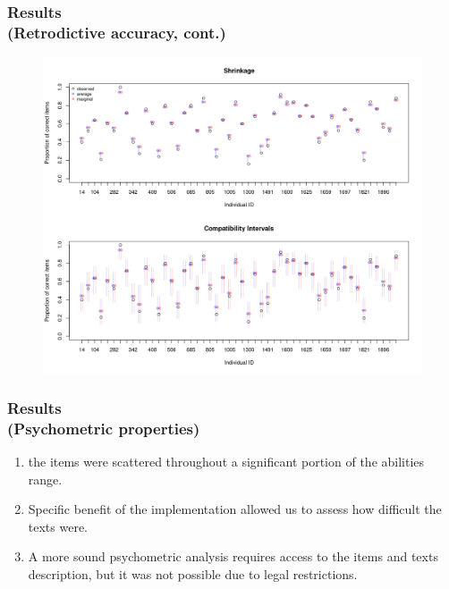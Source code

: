 \documentclass[arial,12pt,xcolor=dvipsnames]{beamer}
\begin{document}
%
\begin{frame}
	\frametitle{Results \\
		(Retrodictive accuracy, cont.)}
	\begin{figure}[H]
		\centering
		\includegraphics[width=0.85\linewidth]{FOLV_NC_HitRate_ind}
		\label{fig:FOLV_pred_app}
	\end{figure} 
\end{frame}
%
\begin{frame}
	\frametitle{Results \\
		(Psychometric properties)}
	\begin{enumerate}
		\item the items were scattered throughout a significant portion of the abilities range. 
		\item Specific benefit of the implementation allowed us to assess
		how difficult the texts were.
		\item A more sound psychometric analysis requires access to the items and texts description, but it was not possible due to legal restrictions.
	\end{enumerate} 
\end{frame}
%
\end{document}
